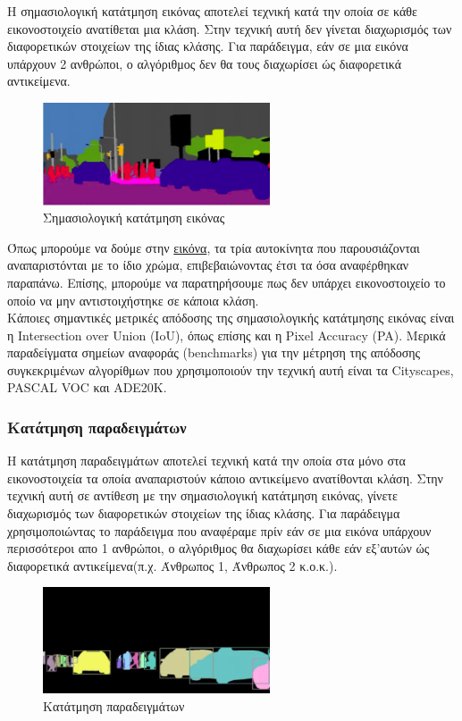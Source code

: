 \documentclass[12pt]{article}
\begin{document}
Η σημασιολογική κατάτμηση εικόνας αποτελεί τεχνική κατά την οποία σε κάθε εικονοστοιχείο ανατίθεται μια κλάση. Στην τεχνική αυτή δεν γίνεται διαχωρισμός των διαφορετικών στοιχείων της ίδιας κλάσης. Για παράδειγμα, εάν σε μια εικόνα υπάρχουν 2 ανθρώποι, ο αλγόριθμος δεν θα τους διαχωρίσει ώς διαφορετικά αντικείμενα.

\begin{figure}[h!]
  \centering
  \includegraphics[width=0.6\textwidth]{images/figure1.png} %
  \caption{Σημασιολογική κατάτμηση εικόνας}
  \label{figure 1}
\end{figure}

Όπως μπορούμε να δούμε στην \hyperref[figure 1]{εικόνα}, τα τρία αυτοκίνητα που παρουσιάζονται αναπαριστόνται με το ίδιο χρώμα, επιβεβαιώνοντας έτσι τα όσα αναφέρθηκαν παραπάνω. Επίσης, μπορούμε να παρατηρήσουμε πως δεν υπάρχει εικονοστοιχείο το οποίο να μην αντιστοιχήστηκε σε κάποια κλάση. \\

Κάποιες σημαντικές μετρικές απόδοσης της σημασιολογικής κατάτμησης εικόνας είναι η Intersection over Union (IoU), όπως επίσης και η Pixel Accuracy (PA). Μερικά παραδείγματα σημείων αναφοράς (benchmarks) για την μέτρηση της απόδοσης συγκεκριμένων αλγορίθμων που χρησιμοποιούν την τεχνική αυτή είναι τα Cityscapes, PASCAL VOC και ADE20K.

\subsubsection{Κατάτμηση παραδειγμάτων}
Η κατάτμηση παραδειγμάτων αποτελεί τεχνική κατά την οποία στα μόνο στα εικονοστοιχεία τα οποία αναπαριστούν κάποιο αντικείμενο ανατίθονται κλάση. Στην τεχνική αυτή σε αντίθεση με την σημασιολογική κατάτμηση εικόνας, γίνετε διαχωρισμός των διαφορετικών στοιχείων της ίδιας κλάσης. Για παράδειγμα χρησιμοποιώντας το παράδειγμα που αναφέραμε πρίν εάν σε μια εικόνα υπάρχουν περισσότεροι απο 1 ανθρώποι, ο αλγόριθμος θα διαχωρίσει κάθε εάν εξ'αυτών ώς διαφορετικά αντικείμενα(π.χ. Άνθρωπος 1, Άνθρωπος 2 κ.ο.κ.).

\begin{figure}[h!]
  \centering
  \includegraphics[width=0.6\textwidth]{images/figure2.png} %
  \caption{Κατάτμηση παραδειγμάτων}
  \label{figure 2}
\end{figure}
\end{document}
